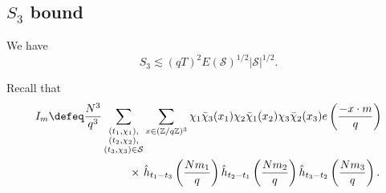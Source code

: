 \subsection{$S_3$ bound} \label{s_3chapter}
\begin{proposition}\label{s_3bound}
    We have \[
    S_3 \lesssim (qT)^2 E(\mathcal{S})^{1/2} |\mathcal{S}|^{1/2}.
    \]
\end{proposition}
Recall that \begin{align*}
	I_m\defeq\frac{N^3}{q^3}\sum_{\substack{(t_1,\chi_1),\\(t_2,\chi_2),\\(t_3,\chi_3)\in\mathcal{S}}} &\sum_{x\in (\mathbb{Z}/q\mathbb{Z})^3}\chi_1\bar{\chi}_3(x_1)\chi_2\bar{\chi}_1(x_2)\chi_3\bar{\chi}_2(x_3) e\left(\frac{-x\cdot m}{q}\right)\\
	\times \ &\hat{h}_{t_1-t_3}\left(\frac{Nm_1}{q}\right)\hat{h}_{t_2-t_1}\left(\frac{Nm_2}{q}\right)\hat{h}_{t_3-t_2}\left(\frac{Nm_3}{q}\right).
\end{align*}

